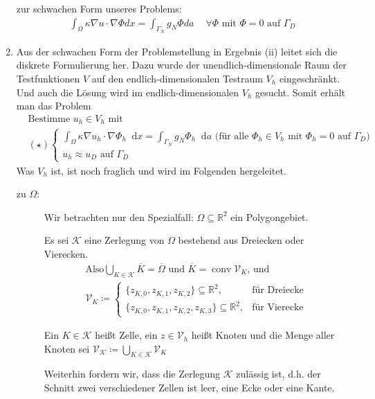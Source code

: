 \documentclass[12pt,a4paper]{scrartcl}
\newcommand{\R}{\mathbb{R}}
\newcommand*\diff{\mathop{}\!\mathrm{d}}
\DeclareMathOperator{\conv}{conv}
\newcommand{\defi}[1]{\textcolor{Mygreen}{#1}}
\numberwithin{equation}{section}
\begin{document}
\begin{enumerate}[label=(\roman*)]
zur \defi{schwachen Form} unseres Problems:
\begin{align*}
\int_{\Omega}{ \kappa \nabla u \cdot \nabla \Phi dx} = \int_{ \Gamma_N }{g_N \Phi da} \text{  } \; \; \forall \Phi \text{ mit } \Phi = 0 \text{ auf } \Gamma_D
\end{align*}

\item
Aus der schwachen Form der Problemstellung in Ergebnis (ii) leitet sich die diskrete Formulierung her. Dazu wurde der unendlich-dimensionale Raum der Testfunktionen $V$ auf den endlich-dimensionalen Testraum $V_h$ eingeschränkt. Und auch die Lösung wird im endlich-dimensionalen $V_h$ gesucht. Somit erhält man das Problem
\begin{align*}
&\text{Bestimme } u_h \in V_h \text{ mit }\\
&(\star)\begin{cases}
	\int_{\Omega} \kappa \nabla u_h \cdot \nabla \Phi_h \diff x = \int_{\Gamma_N} g_N  \Phi_h \diff a \text{ (für alle } \Phi_h \in V_h \text{ mit } \Phi_h = 0 \text{ auf } \Gamma_D) \\
	u_h \approx u_D \text{ auf } \Gamma_D
\end{cases}
\end{align*}
Was $ V_h $ ist, ist noch fraglich und wird im Folgenden hergeleitet.
\begin{description}
	\item [zu $\Omega$:]
	Wir betrachten nur den Spezialfall: $\Omega \subseteq \R^2$ ein Polygongebiet. 
	
	Es sei $\mathcal{K}$ eine Zerlegung von $\Omega$ bestehend aus Dreiecken oder Vierecken.
	\begin{align*}
	\text{Also} \bigcup_{K \in \mathcal{K}} \overline{K} = \overline{\Omega} \text{ und } \overline{K} = \conv \mathcal{V}_K \text{, und}\\
	\mathcal{V}_K \coloneqq
	 \begin{cases}
	\{z_{K,0}, z_{K,1}, z_{K,2}\} \subseteq \R^2, &\text{für Dreiecke} \\
	\{z_{K,0}, z_{K,1}, z_{K,2}, z_{K,3}\} \subseteq \R^2, &\text{für Vierecke}
	\end{cases}
	\end{align*}
	
	Ein $ K \in \mathcal{K} $ heißt \defi{Zelle}, ein $ z \in \mathcal{V}_h $ heißt \defi{Knoten} und die Menge aller Knoten sei $\mathcal{V}_\mathcal{K} \coloneqq \bigcup_{K \in \mathcal{K}} \mathcal{V}_K$
	
	Weiterhin fordern wir, dass die Zerlegung $\mathcal{K}$ zulässig ist, d.h. der Schnitt zwei verschiedener Zellen ist leer, eine Ecke oder eine Kante.
	

\end{description}
\end{enumerate}
\end{document}
